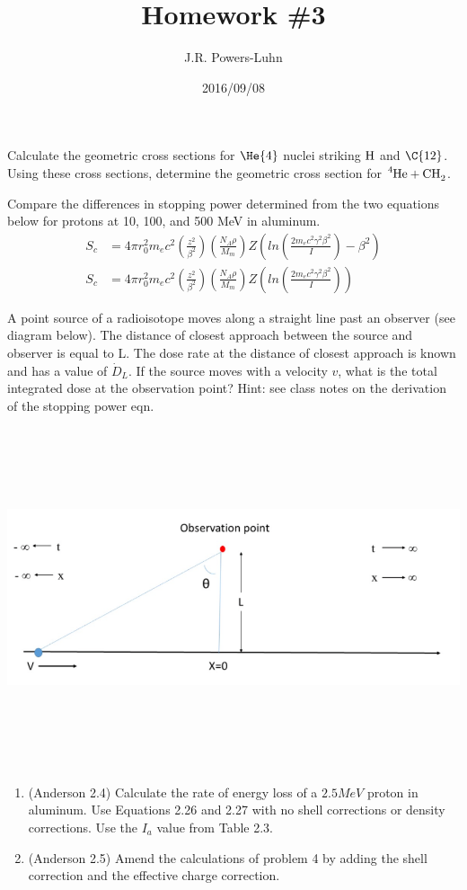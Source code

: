 \documentclass{hw}
\author{J.R. Powers-Luhn}
\date{2016/09/08}
\title{Homework \#3}
\begin{document}
\problem{}
	Calculate the geometric cross sections for $ \He{4} $ nuclei striking $ \ce{H} $ and $ \C{12} $. Using these cross sections, determine the geometric cross section for $ \ce{^4He + CH_2} $.

\solution


\problem{}
	Compare the differences in stopping power determined from the two equations below for protons at 10, 100, and 500 MeV in aluminum.
		\begin{align}
			S_c &= 4 \pi r_0^2 m_e c^2 \left( \frac{z^2}{\beta^2} \right) \left( \frac{N_A \rho}{M_m} \right) Z \left( ln \left( \frac{2 m_e c^2 \gamma^2 \beta^2}{I} \right) - \beta^2 \right) \label{betablockwithbeta} \\
			S_c &= 4 \pi r_0^2 m_e c^2 \left( \frac{z^2}{\beta^2} \right) \left( \frac{N_A \rho}{M_m} \right) Z \left( ln \left( \frac{2 m_e c^2 \gamma^2 \beta^2}{I} \right)\right) \label{betablockwithoutbeta}
		\end{align}

\solution


\problem{}
	A point source of a radioisotope moves along a straight line past an observer (see diagram below). The distance of closest approach between the source and observer is equal to L. The dose rate at the distance of closest approach is known and has a value of $ \dot{D}_L $. If the source moves with a velocity $ v $, what is the total integrated dose at the observation point? Hint: see class notes on the derivation of the stopping power eqn.

	\includegraphics[width=15cm,height=10cm,keepaspectratio]{ne551_03_fig_01}

\solution


	\begin{enumerate}
		\item (Anderson 2.4) Calculate the rate of energy loss of a $ 2.5 MeV $ proton in aluminum. Use Equations 2.26 and 2.27 with no shell corrections or density corrections. Use the $ I_a $ value from Table 2.3.
		\item (Anderson 2.5) Amend the calculations of problem 4 by adding the shell correction and the effective charge correction.
	\end{enumerate}

\solution
\end{document}
